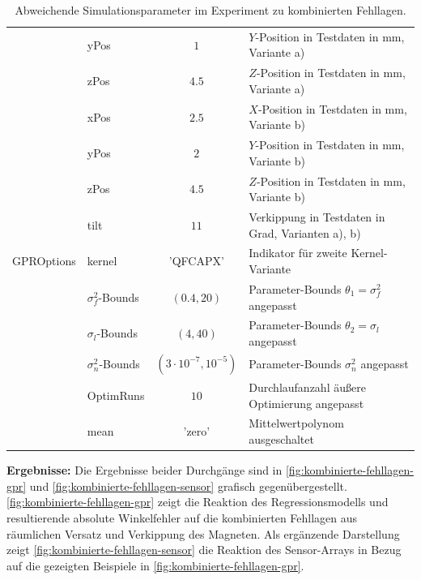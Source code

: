 \begin{table}[htp]
{\begin{tabular}{l l c l}
			                         & yPos                & $1$                         & $Y$-Position in Testdaten in mm, Variante a)           \\
			                         & zPos                & $4.5$                       & $Z$-Position in Testdaten in mm, Variante a)           \\
			                         & xPos                & $2.5$                       & $X$-Position in Testdaten in mm, Variante b)           \\
			                         & yPos                & $2$                         & $Y$-Position in Testdaten in mm, Variante b)           \\
			                         & zPos                & $4.5$                       & $Z$-Position in Testdaten in mm, Variante b)           \\
			                         & tilt                & $11$                        & Verkippung in Testdaten in Grad, Varianten a), b)      \\ \hline
			GPROptions               & kernel              & 'QFCAPX'                    & Indikator für zweite Kernel-Variante                   \\
			                         & $\sigma_f^2$-Bounds & $(0.4, 20)$                 & Parameter-Bounds $\theta_1 = \sigma_f^2$ angepasst     \\
			                         & $\sigma_l$-Bounds   & $(4, 40)$                   & Parameter-Bounds $\theta_2 = \sigma_l$ angepasst       \\
			                         & $\sigma_n^2$-Bounds & $(3 \cdot 10^{-7}, 10^{-5})$ & Parameter-Bounds $\sigma_n^2$ angepasst                \\
			                         & OptimRuns           & $10$                        & Durchlaufanzahl äußere Optimierung angepasst           \\
			                         & mean                & 'zero'                      & Mittelwertpolynom ausgeschaltet                        \\ \bottomrule
		\end{tabular}}
	\caption{Abweichende Simulationsparameter im Experiment zu kombinierten Fehllagen.}
	\label{tab:params-exp6}
\end{table}


\textbf{Ergebnisse:} Die Ergebnisse beider Durchgänge sind in \autoref{fig:kombinierte-fehllagen-gpr} und \autoref{fig:kombinierte-fehllagen-sensor} grafisch gegenübergestellt. \autoref{fig:kombinierte-fehllagen-gpr} zeigt die Reaktion des Regressionsmodells und resultierende absolute Winkelfehler auf die kombinierten Fehllagen aus räumlichen Versatz und Verkippung des Magneten. Als ergänzende Darstellung zeigt \autoref{fig:kombinierte-fehllagen-sensor} die Reaktion des Sensor-Arrays in Bezug auf die gezeigten Beispiele in \autoref{fig:kombinierte-fehllagen-gpr}.


